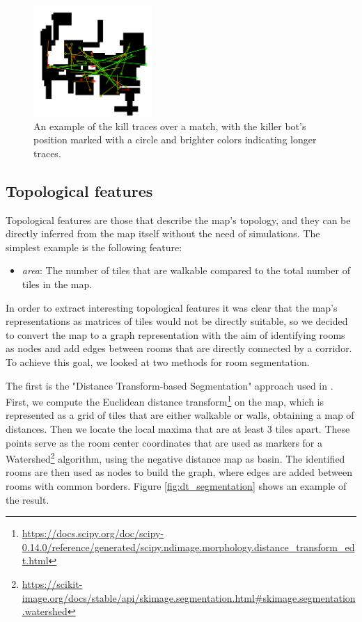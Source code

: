 \begin{figure}[hbt!]
\label{fig:kill_traces_example}
    \centering
    \includegraphics[width=0.4\textwidth]{images/Traces_Example.png}
    \caption[Kill traces example]{An example of the kill traces over a match, with the killer bot's position marked with a circle and brighter colors indicating longer traces.}
\end{figure}

\subsection{Topological features}
\label{subsec:topological_features}
Topological features are those that describe the map's topology, and they can be directly inferred from the map itself without the need of simulations. The simplest example is the following feature: 

\begin{itemize}
    \item \textit{area}: The number of tiles that are walkable compared to the total number of tiles in the map.
\end{itemize}

In order to extract interesting topological features it was clear that the map's representations as matrices of tiles would not be directly suitable, so we decided to convert the map to a graph representation with the aim of identifying rooms as nodes and add edges between rooms that are directly connected by a corridor. To achieve this goal, we looked at two methods for room segmentation. 

The first is the "Distance Transform-based Segmentation" approach used in \citep{bormann_room_2016}. First, we compute the Euclidean distance transform\footnote{\raggedright\url{https://docs.scipy.org/doc/scipy-0.14.0/reference/generated/scipy.ndimage.morphology.distance_transform_edt.html}} on the map, which is represented as a grid of tiles that are either walkable or walls, obtaining a map of distances. Then we locate the local maxima that are at least 3 tiles apart. These points serve as the room center coordinates that are used as markers for a Watershed\footnote{\raggedright\url{https://scikit-image.org/docs/stable/api/skimage.segmentation.html\#skimage.segmentation.watershed}} algorithm, using the negative distance map as basin. The identified rooms are then used as nodes to build the graph, where edges are added between rooms with common borders. Figure \cref{fig:dt_segmentation} shows an example of the result.

